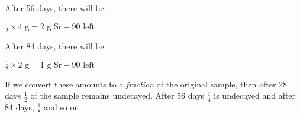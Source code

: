 After 56 days, there will be:
\begin{center}
$\frac{1}{2} \times 4 \text{ g} = 2 \text{ g Sr}-90 \text{ left}$
\end{center}

After 84 days, there will be:
\begin{center}
$\frac{1}{2} \times 2 \text{ g} = 1 \text{ g Sr}-90 \text{ left}$
\end{center}

If we convert these amounts to a \textit{fraction} of the original sample, then after 28 days $\frac{1}{2}$ of the sample remains undecayed. After 56 days $\frac{1}{4}$ is undecayed and after 84 days, $\frac{1}{8}$ and so on.\\
